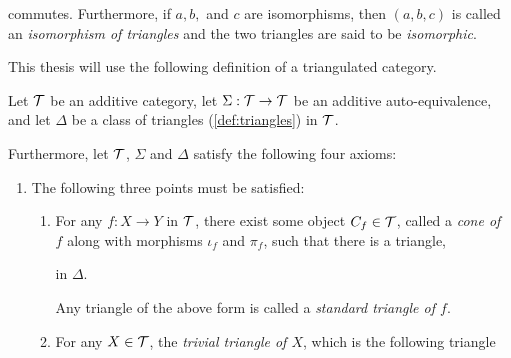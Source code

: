 \begin{definition}[Triangles]
\begin{center}
    \end{center}
    commutes.
    Furthermore, if \( a, b, \) and \( c \) are isomorphisms, then \( (a, b, c) \) is called an \emph{isomorphism of triangles} and the two triangles are said to be \emph{isomorphic}.
\end{definition}

This thesis will use the following definition of a triangulated category.

\begin{definition}
    \label{def:triangulated_category}
    Let \( {\mathcal{T}} \) be an additive category, let \( \Sigma: {\mathcal{T}} \to {\mathcal{T}} \) be an additive auto-equivalence, and let \( \Delta \) be a class of triangles (\autoref{def:triangles}) in \( {\mathcal{T}} \).

    Furthermore, let \( {\mathcal{T}} \), \( \Sigma \) and \( \Delta \) satisfy the following four axioms:
    \begin{enumerate}[label={(\bfseries TR\arabic*)}]
        \item {
            The following three points must be satisfied:
            \begin{enumerate}
                \item {
                    For any \( f: X \to Y \) in \( {\mathcal{T}} \), there exist some object \( C_f \in {\mathcal{T}} \), called a \emph{cone of \( f \)} along with morphisms \( \iota_f \) and \( \pi_f \), such that there is a triangle,
                    \begin{center}
                    \end{center}
                    in \( \Delta \).

                    Any triangle of the above form is called a \emph{standard triangle of \( f \)}.
                }
                \item {
                    For any \( X \in {\mathcal{T}} \), the \emph{trivial triangle of \( X \)}, which is the following triangle
                    \begin{center}
\end{center}}
\end{enumerate}}
\end{enumerate}
\end{definition}
